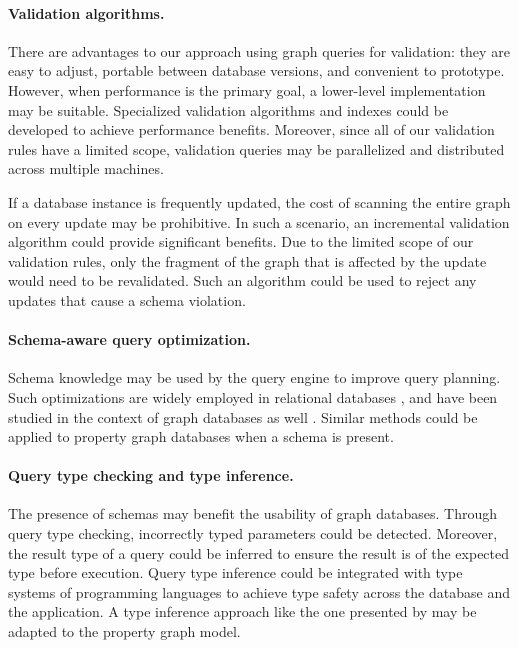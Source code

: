 \documentclass{report}
\theoremstyle{definition}
\begin{document}
\paragraph{Validation algorithms.} There are advantages to our approach using graph queries for validation: they are easy to adjust, portable between database versions, and convenient to prototype. However, when performance is the primary goal, a lower-level implementation may be suitable. Specialized validation algorithms and indexes could be developed to achieve performance benefits. Moreover, since all of our validation rules have a limited scope, validation queries may be parallelized and distributed across multiple machines.

If a database instance is frequently updated, the cost of scanning the entire graph on every update may be prohibitive. In such a scenario, an incremental validation algorithm could provide significant benefits. Due to the limited scope of our validation rules, only the fragment of the graph that is affected by the update would need to be revalidated. Such an algorithm could be used to reject any updates that cause a schema violation.

\paragraph{Schema-aware query optimization.} Schema knowledge may be used by the query engine to improve query planning. Such optimizations are widely employed in relational databases \citep{chakravarthy1990logic, meier2013semantic,silberschatz2011database}, and have been studied in the context of graph databases as well \citep{buneman1997adding,popa1999equational}. Similar methods could be applied to property graph databases when a schema is present.

\paragraph{Query type checking and type inference.} The presence of schemas may benefit the usability of graph databases. Through query type checking, incorrectly typed parameters could be detected. Moreover, the result type of a query could be inferred to ensure the result is of the expected type before execution. Query type inference could be integrated with type systems of programming languages to achieve type safety across the database and the application. A type inference approach like the one presented by \citet{colazzo2015typing} may be adapted to the property graph model.
\end{document}
